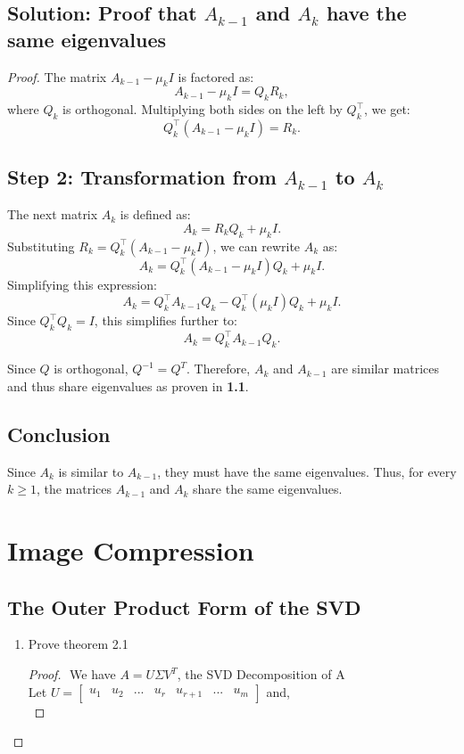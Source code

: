 \documentclass[12pt]{article}
\begin{document}
\subsection{Solution: Proof that \( A_{k-1} \) and \( A_k \) have the same eigenvalues}
\begin{proof}
The matrix \( A_{k-1} - \mu_k I \) is factored as:
\[
A_{k-1} - \mu_k I = Q_k R_k,
\]
where \( Q_k \) is orthogonal. Multiplying both sides on the left by \( Q_k^\top \), we get:
\[
Q_k^\top (A_{k-1} - \mu_k I) = R_k.
\]

\subsection*{Step 2: Transformation from \( A_{k-1} \) to \( A_k \)}  
The next matrix \( A_k \) is defined as:
\[
A_k = R_k Q_k + \mu_k I.
\]
Substituting \( R_k = Q_k^\top (A_{k-1} - \mu_k I) \), we can rewrite \( A_k \) as:
\[
A_k = Q_k^\top (A_{k-1} - \mu_k I) Q_k + \mu_k I.
\]
Simplifying this expression:
\[
A_k = Q_k^\top A_{k-1} Q_k - Q_k^\top (\mu_k I) Q_k + \mu_k I.
\]
Since \( Q_k^\top Q_k = I \), this simplifies further to:
\[
A_k = Q_k^\top A_{k-1} Q_k.
\]

Since $Q$ is orthogonal, $Q^{-1} = Q^T$. Therefore, $A_k $ and $A_{k-1}$ are similar matrices and thus share eigenvalues as proven in \textbf{1.1}.

\subsection*{Conclusion}  
Since \( A_k \) is similar to \( A_{k-1} \), they must have the same eigenvalues. Thus, for every \( k \geq 1 \), the matrices \( A_{k-1} \) and \( A_k \) share the same eigenvalues.

\section{Image Compression}
\subsection{The Outer Product Form of the SVD}

\begin{enumerate}[label=(\alph*)]
\item Prove theorem 2.1
\begin{proof} $ $\newline
We have $A = U\Sigma V^T$, the SVD Decomposition of A \\
Let  $U = \begin{bmatrix} u_1 & u_2 & ... & u_r & u_{r+1} & ... & u_m\end{bmatrix}$ and, \\


\end{proof}
\end{enumerate}
\end{proof}
\end{document}
